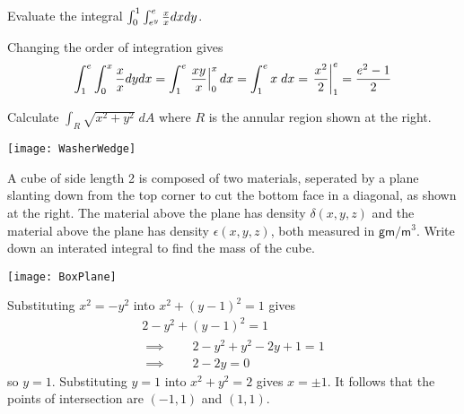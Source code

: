 \documentclass[answers,12pt,addpoints]{exam}
\let\ln\relax\DeclareMathOperator{\ln}{\mathsf{ln}}
\begin{document}
\begin{questions}

\question[25] Evaluate the integral
$\int_0^1\int_{e^y}^e\frac{x}{\ln{x}}dxdy$.
\begin{solution}
Changing the order of integration gives
\[\int_1^e\int_0^{\ln{x}}\frac{x}{\ln{x}}dydx
=\int_1^e\left.\frac{xy}{\ln{x}}\right|_0^{\ln{x}}dx
=\int_1^ex\;dx=\left.\frac{x^2}{2}\right|_1^e
=\frac{e^2-1}{2}\]
\end{solution}

\begin{multicols}{2}
\question[25] Calculate $\int_R\sqrt{x^2+y^2}\;dA$ where $R$
is the annular region shown at the right.
\begin{center}\texttt{[image: WasherWedge]}\end{center}
\end{multicols}

\begin{multicols}{2}
\question[25] A cube of side length 2 is composed
of two materials, seperated by a plane slanting down
from the top corner to cut the bottom face in a diagonal,
as shown at the right. The material above the plane
has density $\delta\left(x,y,z\right)$ and the material
above the plane has density $\epsilon\left(x,y,z\right)$,
both measured in $\mathsf{gm}/\mathsf{m}^3$.
Write down an interated integral to find the mass of the cube.
\begin{center}\texttt{[image: BoxPlane]}\end{center}
\end{multicols}

\question[25] 
\begin{parts}
\begin{solution}[1in]
Substituting $x^2=-y^2$ into $x^2+\left(y-1\right)^2=1$
gives
\begin{align*}
2-y^2+\left(y-1\right)^2=1\\
\implies\qquad 2-y^2+y^2-2y+1=1\\
\implies\qquad 2-2y=0
\end{align*}
so $y=1$. Substituting $y=1$ into $x^2+y^2=2$ gives $x=\pm 1$.
It follows that the points of intersection are $\left(-1,1\right)$
and $\left(1,1\right)$.
\end{solution}

\end{parts}
\end{questions}
\end{document}
